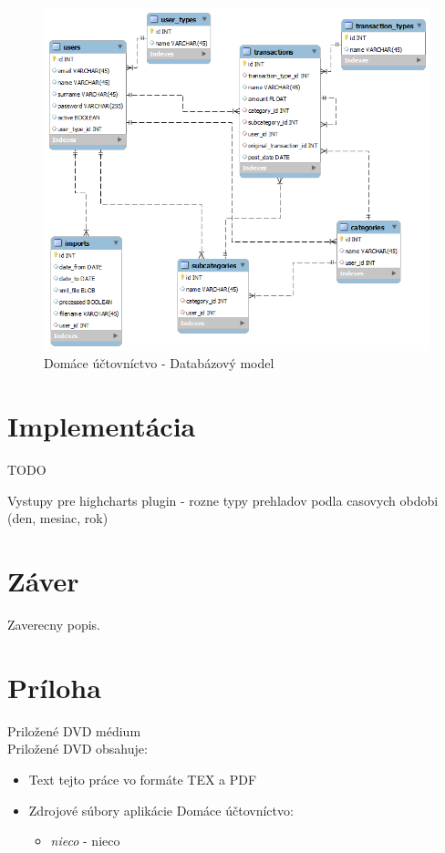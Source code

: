 \documentclass[12pt,onesided]{book}
\begin{document}
\begin{figure}[ht]
  \centering
      \includegraphics[width=15cm]{databazovy_model}
  \caption{Domáce účtovníctvo - Databázový model}
  \label{DataModel}
\end{figure}  


\chapter{Implementácia}
TODO

Vystupy pre highcharts plugin - rozne typy prehladov podla casovych obdobi (den, mesiac, rok)


\chapter{Záver}\label{chap:outro}
 
Zaverecny popis.

\backmatter

\nocite{*}




\newcommand{\dbappendix}[1]{\chapter{#1}}
\appendix
\dbappendix{Príloha}\label{appA}
{\large Priložené DVD médium}\\

Priložené DVD obsahuje:\\
\begin{itemize}
\item Text tejto práce vo formáte TEX a PDF
\item Zdrojové súbory aplikácie Domáce účtovníctvo:
	\begin{itemize}
		\item {\em nieco} - nieco
	\end{itemize}
\end{itemize}
\end{document}
